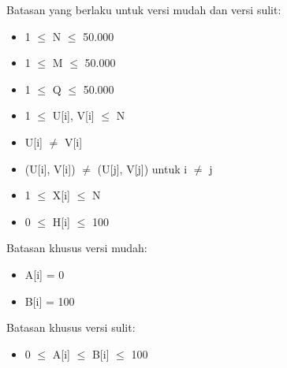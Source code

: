 \documentclass[../main_problemset.tex]{subfiles} %
\begin{document}
\begin{minipage}[t]{0.47\textwidth}

Batasan yang berlaku untuk versi mudah dan versi sulit:

\begin{itemize}
	\item 1 $ \leq $ N $ \leq $ 50.000
	\item 1 $ \leq $ M $ \leq $ 50.000
	\item 1 $ \leq $ Q $ \leq $ 50.000
	\item 1 $ \le $ U[i], V[i] $ \le $ N
	\item U[i] $ \neq $ V[i]
	\item (U[i], V[i]) $ \neq $ (U[j], V[j]) untuk i $ \neq $ j
	\item 1 $ \leq $ X[i] $ \leq $ N
	\item 0 $ \leq $ H[i] $ \leq $ 100
\end{itemize}
\end{minipage}
\begin{minipage}[t]{0.06\textwidth}
	\hfill
\end{minipage}
\begin{minipage}[t]{0.47\textwidth}
Batasan khusus versi mudah:
\begin{itemize}
	\item A[i] = 0
	\item B[i] = 100
\end{itemize}

\vspace{.2cm}

Batasan khusus versi sulit:
\begin{itemize}
	\item 0 $ \le $ A[i] $ \le $ B[i] $ \le $ 100
\end{itemize}
\end{minipage}
\end{document}
